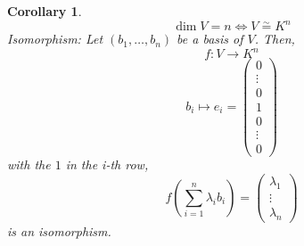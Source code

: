 \documentclass[a4paper,landscape,twocolumn]{article}
\newtheorem{cor}{Corollary}
\begin{document}
\begin{cor}
  \[ \dim{V} = n \Leftrightarrow V \stackrel\sim= K^n \]
  Isomorphism: Let $(b_1, \dots, b_n)$ be a basis of $V$.
  Then,
  \[ f: V \rightarrow K^n \]
  \[ b_i \mapsto e_i = \begin{pmatrix} 0 \\ \vdots \\ 0 \\ 1 \\ 0 \\ \vdots \\ 0 \end{pmatrix} \]
  with the $1$ in the i-th row,
  \[
    f\left(\sum_{i=1}^n \lambda_i b_i\right)
    = \begin{pmatrix} \lambda_1 \\ \vdots \\ \lambda_n \end{pmatrix}
  \]
  is an isomorphism.
\end{cor}
\end{document}
